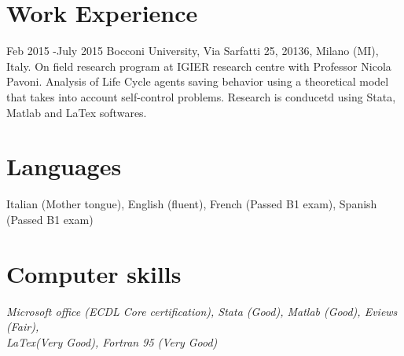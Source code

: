 \documentclass[10pt]{article} %
\begin{document}









\section{Work Experience}


\job
{Feb 2015 -}{July 2015}
{Bocconi University, Via Sarfatti 25, 20136, Milano (MI), Italy.}{}
{On field research program at IGIER research centre with Professor Nicola Pavoni.
}{Analysis of Life Cycle agents saving behavior using a theoretical model that takes into account self-control problems. Research is conducetd using Stata, Matlab and LaTex softwares.}
\small

\section{Languages}
Italian (Mother tongue), English (fluent), French (Passed B1 exam), Spanish (Passed B1 exam)


\section{Computer skills}
\textit{Microsoft office (ECDL Core certification), Stata (Good), Matlab (Good), Eviews (Fair),\\ LaTex(Very Good), Fortran 95 (Very Good)}
\end{document}
